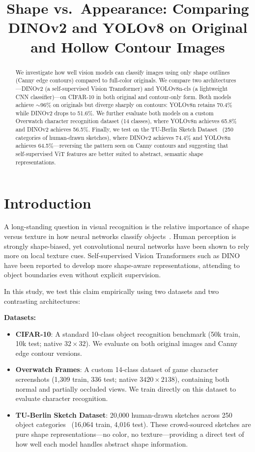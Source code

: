 \documentclass[11pt,a4paper]{article}
\title{Shape vs.\ Appearance: Comparing DINOv2 and YOLOv8 on Original and Hollow Contour Images}
\author{}
\date{}
\begin{document}
\maketitle

\begin{abstract}
We investigate how well vision models can classify images using only shape outlines (Canny edge contours) compared to full-color originals. We compare two architectures---DINOv2 (a self-supervised Vision Transformer) and YOLOv8n-cls (a lightweight CNN classifier)---on CIFAR-10 in both original and contour-only form. Both models achieve $\sim$96\% on originals but diverge sharply on contours: YOLOv8n retains 70.4\% while DINOv2 drops to 51.6\%. We further evaluate both models on a custom Overwatch character recognition dataset (14 classes), where YOLOv8n achieves 65.8\% and DINOv2 achieves 56.5\%. Finally, we test on the TU-Berlin Sketch Dataset~\cite{eitz2012humans} (250 categories of human-drawn sketches), where DINOv2 achieves 74.4\% and YOLOv8n achieves 64.5\%---reversing the pattern seen on Canny contours and suggesting that self-supervised ViT features are better suited to abstract, semantic shape representations.
\end{abstract}

\section{Introduction}

A long-standing question in visual recognition is the relative importance of shape versus texture in how neural networks classify objects~\cite{geirhos2019imagenet}. Human perception is strongly shape-biased, yet convolutional neural networks have been shown to rely more on local texture cues. Self-supervised Vision Transformers such as DINO~\cite{caron2021emerging} have been reported to develop more shape-aware representations, attending to object boundaries even without explicit supervision.

In this study, we test this claim empirically using two datasets and two contrasting architectures:

\textbf{Datasets:}
\begin{itemize}
    \item \textbf{CIFAR-10}: A standard 10-class object recognition benchmark (50k train, 10k test; native $32\times32$). We evaluate on both original images and Canny edge contour versions.
    \item \textbf{Overwatch Frames}: A custom 14-class dataset of game character screenshots (1,309 train, 336 test; native $3420\times2138$), containing both normal and partially occluded views. We train directly on this dataset to evaluate character recognition.
    \item \textbf{TU-Berlin Sketch Dataset}: 20,000 human-drawn sketches across 250 object categories~\cite{eitz2012humans} (16,064 train, 4,016 test). These crowd-sourced sketches are pure shape representations---no color, no texture---providing a direct test of how well each model handles abstract shape information.
\end{itemize}
\end{document}
